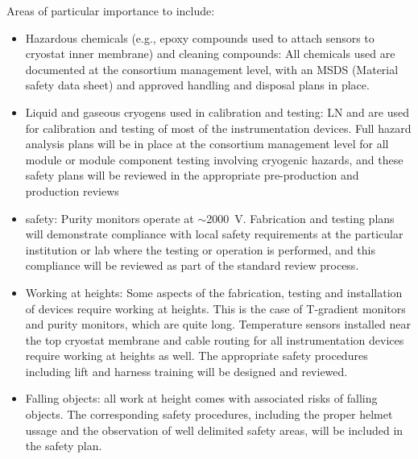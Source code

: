 Areas of particular importance to  include:
\begin{itemize}
\item Hazardous chemicals (e.g., epoxy compounds used to attach sensors to cryostat inner membrane) and cleaning compounds:
  All chemicals used are documented at the consortium management level, with an MSDS (Material safety data sheet) and approved handling and disposal plans in place.

\item Liquid and gaseous cryogens used in calibration and testing: LN and \lar are used for calibration and testing of most of the instrumentation devices.
  Full hazard analysis plans will be in place
    at the consortium management level for all module or
  module component testing involving cryogenic hazards, and these safety plans will be reviewed in the appropriate pre-production and production reviews

\item {} safety:  Purity monitors operate at $\sim$\SI{2000}{V}. Fabrication and testing plans will demonstrate compliance with local
   safety requirements at the particular institution or lab where the testing or operation is performed, and this compliance will be reviewed as part of the standard review process.


\item Working at heights: Some aspects of the fabrication, testing and installation of  devices require working at heights. This is the 
  case of T-gradient monitors and purity monitors, which are quite long. %
  Temperature sensors installed near the top cryostat membrane and cable routing for all instrumentation devices
  require working at heights as well. The appropriate safety procedures including lift and harness training will be designed and reviewed. 
  
\item Falling objects: all work at height comes with associated risks of falling objects. The corresponding safety procedures, including the proper helmet ussage 
  and the observation of  well delimited safety areas, will be included in the safety plan. 
\end{itemize}
  

  


